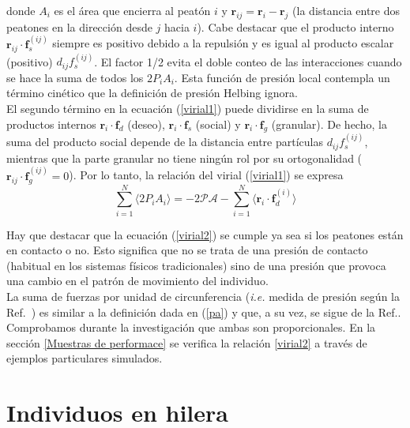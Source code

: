 donde $A_i$ es el área que encierra al peatón $i$ y 
$\mathbf{r}_{ij}=\mathbf{r}_{i}-\mathbf{r}_j$ (la distancia
entre dos peatones en la dirección desde $j$ hacia $i$). Cabe destacar que el producto interno $\mathbf{r}_{ij}\cdot\mathbf{f}_s^{(ij)}$ siempre es positivo debido a la repulsión y es igual al producto escalar (positivo) $d_{ij}f_s^{(ij)}$. El factor 1/2 evita el doble conteo de las interacciones cuando se hace la suma de todos los $2P_iA_i$. Esta función de presión local contempla un término cinético que la definición de presión Helbing ignora. \\ 

El segundo término en la ecuación (\ref{virial1}) puede dividirse en la suma de productos internos $\mathbf{r}_i\cdot\mathbf{f}_d$ (deseo), 
$\mathbf{r}_i\cdot\mathbf{f}_s$ (social) y $\mathbf{r}_i\cdot\mathbf{f}_g$ (granular). De hecho, la suma del producto social depende de la distancia entre partículas $d_{ij}f_s^{(ij)}$, mientras que la parte granular no tiene ningún rol por su ortogonalidad ($\mathbf{r}_{ij}\cdot\mathbf{f}_g^{(ij)}=0$). Por lo tanto, la relación del virial (\ref{virial1}) se expresa \\  

\begin{equation}
 \displaystyle\sum_{i=1}^N\langle2P_iA_i 
\rangle=-2\mathcal{PA} -\displaystyle\sum_{i=1}^N \langle
\mathbf{r}_i\cdot\mathbf{f}_d^{(i)}\rangle\label{virial2}
\end{equation}

Hay que destacar que la ecuación (\ref{virial2}) se cumple ya sea si los peatones están en contacto o no. Esto significa que no se trata de una presión de contacto (habitual en los sistemas físicos tradicionales) sino de una presión que provoca una cambio en el patrón de movimiento del individuo.\\

La suma de fuerzas por unidad de circunferencia (\textit{i.e.} medida de presión según la Ref.~\cite{Helbing1}) es similar a la definición dada en (\ref{pa}) y que, a su vez, se sigue de la Ref.\cite{lion}. Comprobamos durante la investigación que ambas son proporcionales. En la sección \ref{Muestras de performace} se verifica la relación \eqref{virial2} a través de ejemplos particulares simulados.\\   

\section{\label{social_pressure} Individuos en hilera}

